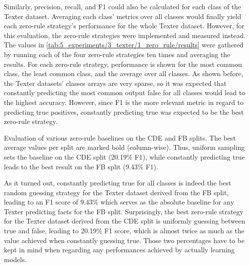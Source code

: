 Similarly, precision, recall, and F1 could also be calculated for each class of the Texter dataset. Averaging each class' metrics over all classes would finally yield each zero-rule strategy's performance for the whole Texter dataset. However, for this evaluation, the zero-rule strategies were implemented and measured instead. The values in \autoref{tab:5_experiments/3_texter/1_zero_rule/results} were gathered by running each of the four zero-rule strategies ten times and averaging the results. For each zero-rule strategy, performance is shown for the most common class, the least common class, and the average over all classes. As shown before, the Texter datasets' classes arrays are very sparse, so it was expected that constantly predicting the most common output false for all classes would lead to the highest accuracy. However, since F1 is the more relevant metric in regard to predicting true positives, constantly predicting true was expected to be the best zero-rule strategy.

\begin{table}[t]
    \makebox[\textwidth][c]{
        
    }
    \caption{Evaluation of various zero-rule baselines on the CDE and FB splits. The best average values per split are marked bold (column-wise). Thus, uniform sampling sets the baseline on the CDE split (20.19\% F1), while constantly predicting true leads to the best result on the FB split (9.43\% F1).}
    \label{tab:5_experiments/3_texter/1_zero_rule/results}
\end{table}

As it turned out, constantly predicting true for all classes is indeed the best random guessing strategy for the Texter dataset derived from the FB split, leading to an F1 score of 9.43\% which serves as the absolute baseline for any Texter predicting facts for the FB split. Surprisingly, the best zero-rule strategy for the Texter dataset derived from the CDE split is uniformly guessing between true and false, leading to 20.19\% F1 score, which is almost twice as much as the value achieved when constantly guessing true. Those two percentages have to be kept in mind when regarding any performances achieved by actually learning models.
